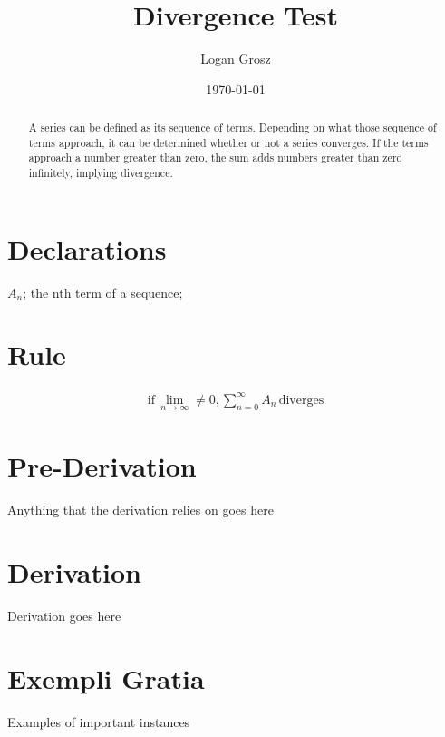 \documentclass{article}
\begin{document}
	
\author{Logan Grosz}
\title{Divergence Test}
\date{\today}

\maketitle

\begin{abstract}
	A series can be defined as its sequence of terms. Depending on what those sequence of terms approach, it can be determined whether or not a series converges. If the terms approach a number greater than zero, the sum adds numbers greater than zero infinitely, implying divergence.
\end{abstract}

\section{Declarations}

	$A_n$; the nth term of a sequence;

\section{Rule}

\begin{gather}
	\text{if} \, \lim\limits_{n \to \infty} \neq 0, \sum_{n=0}^{\infty}A_n \, \text{diverges}
\end{gather}

\section{Pre-Derivation}
Anything that the derivation relies on goes here

\section{Derivation}

Derivation goes here

\section{Exempli Gratia}

Examples of important instances
\end{document}
